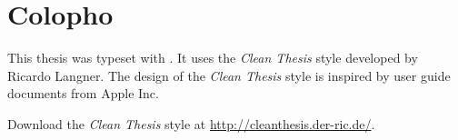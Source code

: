 \pagestyle{empty}
\hfill
\vfill
{}
\section*{Colopho}

This thesis was typeset with \LaTeXe.
It uses the \textit{Clean Thesis} style developed by Ricardo Langner.
The design of the \textit{Clean Thesis} style is inspired by user guide documents from Apple Inc.

Download the \textit{Clean Thesis} style at \url{http://cleanthesis.der-ric.de/}.
